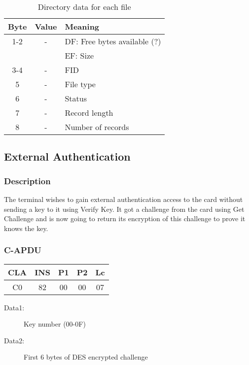 \documentclass[a4paper,oneside]{article}
\begin{document}
\begin{table}[h!]
\caption{Directory data for each file}
\begin{center}
\begin{tabular}{|c|c|l|} \hline
Byte & Value & Meaning  \\ \hline \hline
1-2  &  -  &  DF: Free bytes available (?) \\
     &     &  EF: Size \\ \hline
3-4  &  -  &  FID  \\ \hline
5    &  -  &  File type \\ \hline
6    &  -  &  Status \\ \hline
7    &  -  &  Record length \\ \hline
8    &  -  &  Number of records \\ \hline
\end{tabular}
\end{center}
\end{table}


\subsection{External Authentication}

\subsubsection*{Description}

The terminal wishes to gain external authentication access to the
card without sending a key to it using Verify Key. It got a
challenge from the card using Get Challenge and is now going to
return its encryption of this challenge to prove it knows the key.

\subsubsection*{C-APDU}

\begin{tabular}{|c|c|c|c|c|} \hline
CLA & INS & P1 & P2 & Lc \\ \hline \hline
C0 & 82 & 00 & 00 & 07 \\ \hline
\end{tabular}

\begin{description}
\item[Data1:] Key number (00-0F)
\item[Data2:] First 6 bytes of DES encrypted challenge
\end{description}
\end{document}
